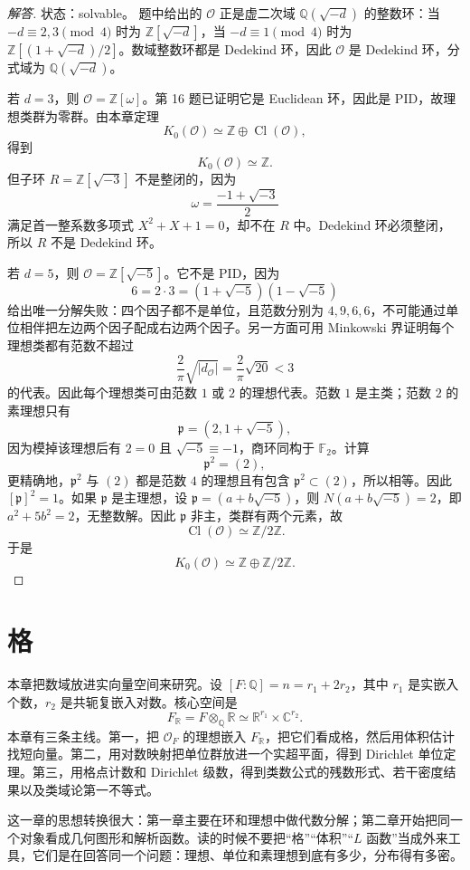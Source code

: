\documentclass[11pt,a4paper,openany]{ctexbook}
\numberwithin{equation}{chapter}
\newcommand{\Q}{\mathbb{Q}}
\newcommand{\R}{\mathbb{R}}
\newcommand{\C}{\mathbb{C}}
\newcommand{\Z}{\mathbb{Z}}
\newcommand{\F}{\mathbb{F}}
\newcommand{\OF}{\mathcal{O}_F}
\newcommand{\Cl}{\operatorname{Cl}}
\theoremstyle{plain}
\theoremstyle{definition}
\theoremstyle{remark}
\begin{document}
\begin{proof}[解答]
状态：solvable。
题中给出的 $\mathcal O$ 正是虚二次域 $\Q(\sqrt{-d})$ 的整数环：当 $-d\equiv2,3\pmod4$ 时为 $\Z[\sqrt{-d}]$，当 $-d\equiv1\pmod4$ 时为 $\Z[(1+\sqrt{-d})/2]$。数域整数环都是 Dedekind 环，因此 $\mathcal O$ 是 Dedekind 环，分式域为 $\Q(\sqrt{-d})$。

若 $d=3$，则 $\mathcal O=\Z[\omega]$。第 16 题已证明它是 Euclidean 环，因此是 PID，故理想类群为零群。由本章定理
\[
K_0(\mathcal O)\simeq\Z\oplus\Cl(\mathcal O),
\]
得到
\[
K_0(\mathcal O)\simeq\Z.
\]
但子环 $R=\Z[\sqrt{-3}]$ 不是整闭的，因为
\[
\omega=\frac{-1+\sqrt{-3}}2
\]
满足首一整系数多项式 $X^2+X+1=0$，却不在 $R$ 中。Dedekind 环必须整闭，所以 $R$ 不是 Dedekind 环。

若 $d=5$，则 $\mathcal O=\Z[\sqrt{-5}]$。它不是 PID，因为
\[
6=2\cdot3=(1+\sqrt{-5})(1-\sqrt{-5})
\]
给出唯一分解失败：四个因子都不是单位，且范数分别为 $4,9,6,6$，不可能通过单位相伴把左边两个因子配成右边两个因子。另一方面可用 Minkowski 界证明每个理想类都有范数不超过
\[
\frac{2}{\pi}\sqrt{|d_{\mathcal O}|}
=\frac{2}{\pi}\sqrt{20}<3
\]
的代表。因此每个理想类可由范数 $1$ 或 $2$ 的理想代表。范数 $1$ 是主类；范数 $2$ 的素理想只有
\[
\mathfrak p=(2,1+\sqrt{-5}),
\]
因为模掉该理想后有 $2=0$ 且 $\sqrt{-5}\equiv-1$，商环同构于 $\F_2$。计算
\[
\mathfrak p^2=(2),
\]
更精确地，$\mathfrak p^2$ 与 $(2)$ 都是范数 $4$ 的理想且有包含
$\mathfrak p^2\subset(2)$，所以相等。因此 $[\mathfrak p]^2=1$。如果
$\mathfrak p$ 是主理想，设 $\mathfrak p=(a+b\sqrt{-5})$，则
$N(a+b\sqrt{-5})=2$，即 $a^2+5b^2=2$，无整数解。因此
$\mathfrak p$ 非主，类群有两个元素，故
\[
\Cl(\mathcal O)\simeq\Z/2\Z.
\]
于是
\[
K_0(\mathcal O)\simeq\Z\oplus\Z/2\Z.
\]
\end{proof}


 \chapter{格}

本章把数域放进实向量空间来研究。设 $[F:\Q]=n=r_1+2r_2$，其中 $r_1$ 是实嵌入个数，$r_2$ 是共轭复嵌入对数。核心空间是
\[
F_\R=F\otimes_\Q\R\simeq \R^{r_1}\times\C^{r_2}.
\]
本章有三条主线。第一，把 $\OF$ 的理想嵌入 $F_\R$，把它们看成格，然后用体积估计找短向量。第二，用对数映射把单位群放进一个实超平面，得到 Dirichlet 单位定理。第三，用格点计数和 Dirichlet 级数，得到类数公式的残数形式、若干密度结果以及类域论第一不等式。

这一章的思想转换很大：第一章主要在环和理想中做代数分解；第二章开始把同一个对象看成几何图形和解析函数。读的时候不要把“格”“体积”“$L$ 函数”当成外来工具，它们是在回答同一个问题：理想、单位和素理想到底有多少，分布得有多密。
\end{document}
